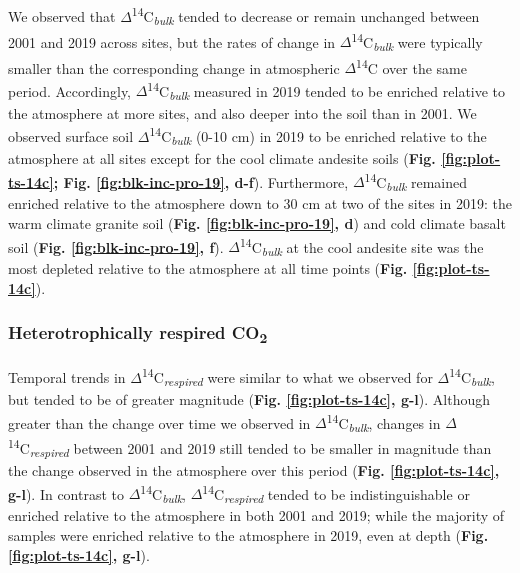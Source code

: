 \documentclass[english,man,floatsintext]{apa6}
\begin{document}
We observed that \(\Delta\)\textsuperscript{14}C\textsubscript{\emph{bulk}} tended to decrease or remain unchanged between 2001 and 2019 across sites, but the rates of change in \(\Delta\)\textsuperscript{14}C\textsubscript{\emph{bulk}} were typically smaller than the corresponding change in atmospheric \(\Delta\)\textsuperscript{14}C over the same period. Accordingly, \(\Delta\)\textsuperscript{14}C\textsubscript{\emph{bulk}} measured in 2019 tended to be enriched relative to the atmosphere at more sites, and also deeper into the soil than in 2001. We observed surface soil \(\Delta\)\textsuperscript{14}C\textsubscript{\emph{bulk}} (0-10 cm) in 2019 to be enriched relative to the atmosphere at all sites except for the cool climate andesite soils (\textbf{Fig. \ref{fig:plot-ts-14c}; Fig. \ref{fig:blk-inc-pro-19}, d-f}). Furthermore, \(\Delta\)\textsuperscript{14}C\textsubscript{\emph{bulk}} remained enriched relative to the atmosphere down to 30 cm at two of the sites in 2019: the warm climate granite soil (\textbf{Fig. \ref{fig:blk-inc-pro-19}, d}) and cold climate basalt soil (\textbf{Fig. \ref{fig:blk-inc-pro-19}, f}). \(\Delta\)\textsuperscript{14}C\textsubscript{\emph{bulk}} at the cool andesite site was the most depleted relative to the atmosphere at all time points (\textbf{Fig. \ref{fig:plot-ts-14c}}).

\hypertarget{heterotrophically-respired-co2-1}{%
\subsubsection{\texorpdfstring{Heterotrophically respired CO\textsubscript{2}}{Heterotrophically respired CO2}}\label{heterotrophically-respired-co2-1}}

Temporal trends in \(\Delta\)\textsuperscript{14}C\textsubscript{\emph{respired}} were similar to what we observed for \(\Delta\)\textsuperscript{14}C\textsubscript{\emph{bulk}}, but tended to be of greater magnitude (\textbf{Fig. \ref{fig:plot-ts-14c}, g-l}). Although greater than the change over time we observed in \(\Delta\)\textsuperscript{14}C\textsubscript{\emph{bulk}}, changes in \(\Delta\)\textsuperscript{14}C\textsubscript{\emph{respired}} between 2001 and 2019 still tended to be smaller in magnitude than the change observed in the atmosphere over this period (\textbf{Fig. \ref{fig:plot-ts-14c}, g-l}). In contrast to \(\Delta\)\textsuperscript{14}C\textsubscript{\emph{bulk}}, \(\Delta\)\textsuperscript{14}C\textsubscript{\emph{respired}} tended to be indistinguishable or enriched relative to the atmosphere in both 2001 and 2019; while the majority of samples were enriched relative to the atmosphere in 2019, even at depth (\textbf{Fig. \ref{fig:plot-ts-14c}, g-l}).
\end{document}
